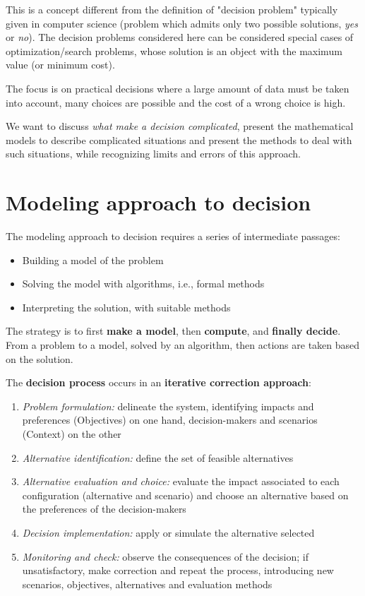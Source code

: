 This is a concept different from the definition of "decision problem" typically given in computer science (problem which admits only two possible solutions, \textit{yes} or \textit{no}). The decision problems considered here can be considered special cases of optimization/search problems, whose solution is an object with the maximum value (or minimum cost). 

The focus is on practical decisions where a large amount of data must be taken into account, many choices are possible and the cost of a wrong choice is high.

We want to discuss \textit{what make a decision complicated}, present the mathematical models to describe complicated situations and present the methods to deal with such situations, while recognizing limits and errors of this approach.

\section{Modeling approach to decision}
\label{sec:modelingapproach}

The modeling approach to decision requires a series of intermediate passages: 
\begin{itemize}
	\item Building a model of the problem
	
	\item Solving the model with algorithms, i.e., formal methods
	
	\item Interpreting the solution, with suitable methods
\end{itemize}

The strategy is to first \textbf{make a model}, then \textbf{compute}, and \textbf{finally decide}. From a problem to a model, solved by an algorithm, then actions are taken based on the solution.

The \textbf{decision process} occurs in an \textbf{iterative correction approach}:
\begin{enumerate}
	\item \textit{Problem formulation:} delineate the system, identifying impacts and preferences (Objectives) on one hand, decision-makers and scenarios (Context) on the other
	
	\item \textit{Alternative identification:} define the set of feasible alternatives
	
	\item \textit{Alternative evaluation and choice:} evaluate the impact associated to each configuration (alternative and scenario) and choose an alternative based on the preferences of the decision-makers
	
	\item \textit{Decision implementation:} apply or simulate the alternative selected
	
	\item \textit{Monitoring and check:} observe the consequences of the decision; if unsatisfactory, make correction and repeat the process, introducing new scenarios, objectives, alternatives and evaluation methods
\end{enumerate}

